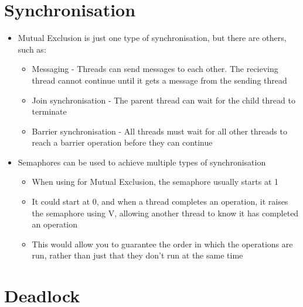 
\section*{Synchronisation}

\begin{itemize}
  \item Mutual Exclusion is just one type of synchronisation, but there are others, such as:
  \begin{itemize}
    \item Messaging - Threads can send messages to each other. The recieving thread cannot continue until it gets a message from the sending thread
    \item Join synchronisation - The parent thread can wait for the child thread to terminate
    \item Barrier synchronisation - All threads must wait for all other threads to reach a barrier operation before they can continue
  \end{itemize}
  \item Semaphores can be used to achieve multiple types of synchronisation
  \begin{itemize}
    \item When using for Mutual Exclusion, the semaphore usually starts at 1
    \item It could start at 0, and when a thread completes an operation, it raises the semaphore using V, allowing another thread to know it has completed an operation
    \item This would allow you to guarantee the order in which the operations are run, rather than just that they don't run at the same time
  \end{itemize}
\end{itemize}

\section*{Deadlock}

